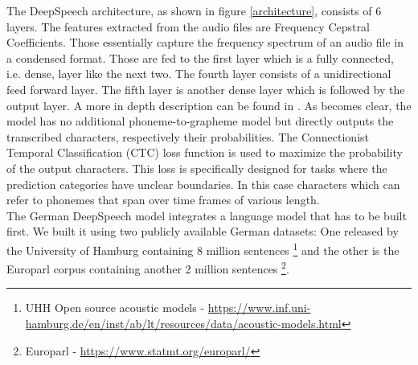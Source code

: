 The DeepSpeech architecture, as shown in figure \ref{architecture}, consists of 6 layers. The features extracted from the audio files are Frequency Cepstral Coefficients. Those essentially capture the frequency spectrum of an audio file in a condensed format. Those are fed to the first layer which is a fully connected, i.e. dense, layer like the next two. The fourth layer consists of a unidirectional feed forward layer. The fifth layer is another dense layer which is followed by the output layer. A more in depth description can be found in \citet{Agarwal2019GermanES}. As becomes clear, the model has no additional phoneme-to-grapheme model but directly outputs the transcribed characters, respectively their probabilities. The Connectionist Temporal Classification (CTC) loss function is used to maximize the probability of the output characters. This loss is specifically designed for tasks where the prediction categories have unclear boundaries. In this case characters which can refer to phonemes that span over time frames of various length.
\\
The German DeepSpeech model integrates a language model that has to be built first. We built it using two publicly available German datasets: One released by the University of Hamburg containing 8
million sentences \footnote{UHH Open source acoustic models - \url{https://www.inf.uni-hamburg.de/en/inst/ab/lt/resources/data/acoustic-models.html}} and the other is the Europarl corpus containing another 2 million sentences
\footnote{Europarl - \url{https://www.statmt.org/europarl/}}.
